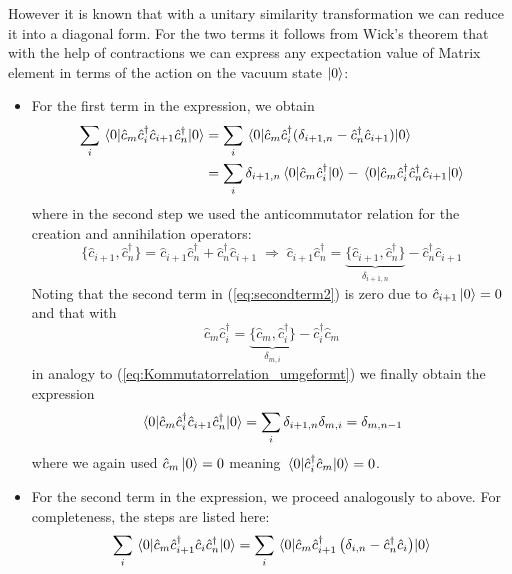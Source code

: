 \documentclass[11pt, a4paper]{article}
\theoremstyle{definition} %
\begin{document}
	
	 However it is known that with a unitary similarity transformation we can reduce it into a diagonal form. For the two terms it follows from Wick's theorem that with the help of contractions we can express any expectation value of Matrix element in terms of the action on the vacuum state $\ket{0}$:
	 \begin{itemize}
	 	\item For the first term in the expression, we obtain
	 	\begin{align}
	 		\sum_i \mel{0}{\hat{c}_m \hat{c}_{i}^\dagger \hat{c}_{i+1} \hat{c}_n^\dagger}{0} &= \sum_i \mel{0}{\hat{c}_m \hat{c}_i^\dagger (\delta_{i +1, n} - \hat{c}_n^\dagger\hat{c}_{i+1})}{0}\\
	 		 &= \sum_i \delta_{i+1, n} \mel{0}{\hat{c}_m \hat{c}_i^\dagger}{0} - \mel{0}{\hat{c}_m \hat{c}_i^\dagger \hat{c}_n^\dagger\hat{c}_{i+1}}{0}
	 		 \label{eq:secondterm2}
	 	\end{align}
	 	where in the second step we used the anticommutator relation for the creation and annihilation operators:
	 	\begin{equation}
	 		\{ \hat{c}_{i+1}, \hat{c}_n^\dagger \} = \hat{c}_{i+1} \hat{c}_n^\dagger + \hat{c}_n^\dagger\hat{c}_{i+1} \; \Rightarrow \; \hat{c}_{i+1} \hat{c}_n^\dagger = \underbrace{\{ \hat{c}_{i+1}, \hat{c}_n^\dagger \}}_{\delta_{i+1, n}} - \hat{c}_n^\dagger \hat{c}_{i+1}
	 		\label{eq:Kommutatorrelation_umgeformt}
	 	\end{equation}
	 	Noting that the second term in (\ref{eq:secondterm2}) is zero due to $\hat{c}_{i+1}\ket{0} =0$ and that with
	 	\begin{equation}
	 		\hat{c}_m \hat{c}_{i}^\dagger = \underbrace{\{ \hat{c}_m, \hat{c}_i^\dagger\}}_{\delta_{m, i}} - \hat{c}_i^\dagger \hat{c}_m
	 	\end{equation}
	 	in analogy to (\ref{eq:Kommutatorrelation_umgeformt}) we finally obtain the expression
	 	\begin{equation}
	 		\mel{0}{\hat{c}_m \hat{c}_i^\dagger \hat{c}_{i+1}\hat{c}_n^\dagger}{0} = \sum_i \delta_{i+1,n}\delta_{m, i} =\delta_{m, n-1}
	 		\label{eq:first_term_correlation_matrix}
	 	\end{equation}
	 	where we again used $\hat{c}_m \ket{0} = 0$ meaning $\mel{0}{\hat{c}_i^\dagger \hat{c}_m}{0} = 0$.
	 	 \item For the second term in the expression, we proceed analogously to above. For completeness, the steps are listed here:
	 	 \begin{align}
	 		\sum_i \mel{0}{\hat{c}_m \hat{c}_{i+1}^\dagger \hat{c}_{i} \hat{c}_n^\dagger}{0} &= \sum_i \mel{0}{\hat{c}_m \hat{c}_{i+1}^\dagger \left( \delta_{i,n} - \hat{c}_n^\dagger \hat{c}_i \right)}{0} \\

\end{align}
\end{itemize}
\end{document}
